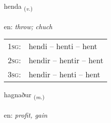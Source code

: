 \documentclass[frontgrid, backgrid]{flacards}\usepackage[]{graphicx}\usepackage[]{color}
\begin{document}
\renewcommand{\flhead}{\vskip5pt \fboxsep=0pt {\small\bfseries\footnotesize Sagnorð | Verb}}
\renewcommand{\fcfoot}{\vskip5pt \fboxsep=0pt \hspace{2pt}{\small\bfseries\footnotesize 2K}}

\renewcommand{\blhead}{\vskip5pt {\small\bfseries\footnotesize Sagnorð | Verb }}
\renewcommand{\bcfoot}{\vskip5pt \hspace{2pt}{\small\bfseries\footnotesize 2K}}


{henda \small{\textsubscript{(\textit{v.})}} \\[1ex] %
\textphonetic{[hɛnta]} \\
en: \emph{throw; chuch} \\  [2ex]
\renewcommand*{\arraystretch}{0.8}
\begin{tabular}{p{1cm}l}
\textsc{1sg}: & hendi -- henti -- hent \\ 
\textsc{2sg}: & hendir -- hentir -- hent \\ 
\textsc{3sg}: & hendir -- henti -- hent \\ 
\end{tabular}
}

\renewcommand{\flhead}{\vskip5pt \fboxsep=0pt {\small\bfseries\footnotesize Nafnorð | Noun}}
\renewcommand{\fcfoot}{\vskip5pt \fboxsep=0pt \hspace{2pt}{\small\bfseries\footnotesize 2K}}

\renewcommand{\blhead}{\vskip5pt {\small\bfseries\footnotesize Nafnorð | Noun }}
\renewcommand{\bcfoot}{\vskip5pt \hspace{2pt}{\small\bfseries\footnotesize 2K}}


{hagnaður \small{\textsubscript{(\textit{m.})}} \\[1ex] %
\textphonetic{[haknaðʏr]} \\
en: \emph{profit, gain} \\  [2ex]
\renewcommand*{\arraystretch}{0.8}
}
\end{document}
